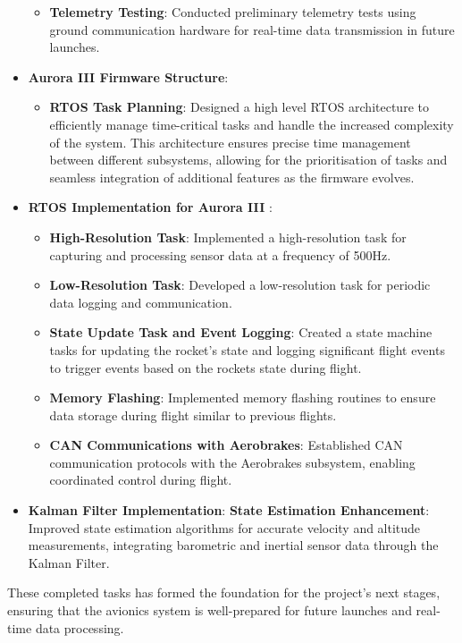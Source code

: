 \begin{itemize}
\begin{itemize}
        \item \textbf{Telemetry Testing}: Conducted preliminary telemetry tests using ground communication hardware for real-time data transmission in future launches.
    \end{itemize}
    \item \textbf{Aurora III Firmware Structure}:
\begin{itemize}    
    \item \textbf{RTOS Task Planning}: Designed a high level RTOS architecture to efficiently manage time-critical tasks and handle the increased complexity of the system. This architecture ensures precise time management between different subsystems, allowing for the prioritisation of tasks and seamless integration of additional features as the firmware evolves. 
\end{itemize}
    \item \textbf{RTOS Implementation for Aurora III }:
    \begin{itemize}
        \item \textbf{High-Resolution Task}: Implemented a high-resolution task for capturing and processing sensor data at a frequency of 500Hz.
        \item \textbf{Low-Resolution Task}: Developed a low-resolution task for periodic data logging and communication.
        \item \textbf{State Update Task and Event Logging}: Created a state machine tasks for updating the rocket's state and logging significant flight events to trigger events based on the rockets state during flight.
        \item \textbf{Memory Flashing}: Implemented memory flashing routines to ensure data storage during flight similar to previous flights.
        \item \textbf{CAN Communications with Aerobrakes}: Established CAN communication protocols with the Aerobrakes subsystem, enabling coordinated control during flight.
    \end{itemize}
    \item \textbf{Kalman Filter Implementation}:
\textbf{State Estimation Enhancement}: Improved state estimation algorithms for accurate velocity and altitude measurements, integrating barometric and inertial sensor data through the Kalman Filter.

\end{itemize}

These completed tasks has formed the foundation for the project's next stages, ensuring that the avionics system is well-prepared for future launches and real-time data processing.


